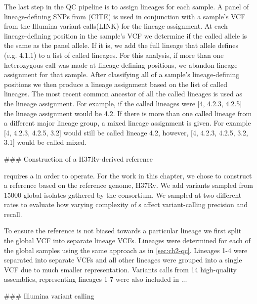 \begin{markdown}
The last step in the QC pipeline is to assign lineages for each sample. A panel of lineage-defining SNPs from (CITE) is used in conjunction with a sample's VCF from the Illumina variant calls(LINK) for the lineage assignment. At each lineage-defining position in the sample's VCF we determine if the called allele is the same as the panel allele. If it is, we add the full lineage that allele defines (e.g. 4.1.1) to a list of called lineages. For this analysis, if more than one heterozygous call was made at lineage-defining positions, we abandon lineage assignment for that sample. After classifying all of a sample's lineage-defining positions we then produce a lineage assignment based on the list of called lineages. The most recent common ancestor of all the called lineages is used as the lineage assignment. For example, if the called lineages were [4, 4.2.3, 4.2.5] the lineage assignment would be 4.2. If there is more than one called lineage from a different major lineage group, a mixed lineage assignment is given. For example [4, 4.2.3, 4.2.5, 3.2] would still be called lineage 4.2, however, [4, 4.2.3, 4.2.5, 3.2, 3.1] would be called mixed.


### Construction of a H37Rv-derived \mtb{} reference \prg{}

\pandora{} requires a \prg{} in order to operate. For the work in this chapter, we chose to construct a reference \prg{} based on the \mtb{} reference genome, H37Rv. We add variants sampled from 15000 global  \mtb{} isolates gathered by the \cryptic{} consortium. We sampled at two different rates to evaluate how varying complexity of \prg{}s affect variant-calling precision and recall.

To ensure the reference \prg{} is not biased towards a particular lineage we first split the global \cryptic{} VCF into separate lineage VCFs. Lineages were determined for each of the global samples using the same approach as in \autoref{sec:ch2-qc}. Lineages 1-4 were separated into separate VCFs and all other lineages were grouped into a single VCF due to much smaller representation. Variants calls from 14 high-quality \mtb{} assemblies, representing lineages 1-7 were also included in ...


### Illumina variant calling





\end{markdown}